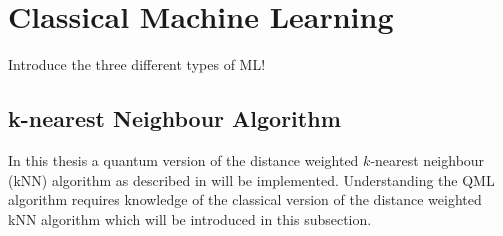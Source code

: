 
\section{Classical Machine Learning}
\label{subsec:classicalmachinelearning}

Introduce the three different types of ML!



\subsection{k-nearest Neighbour Algorithm}
\label{subsubsec:knearestneighbour}

In this thesis a quantum version of the distance weighted $k$-nearest neighbour (kNN) algorithm as described in \cite{Schuld2014} will be implemented. Understanding the QML algorithm requires knowledge of the classical version of the distance weighted kNN algorithm which will be introduced in this subsection.


